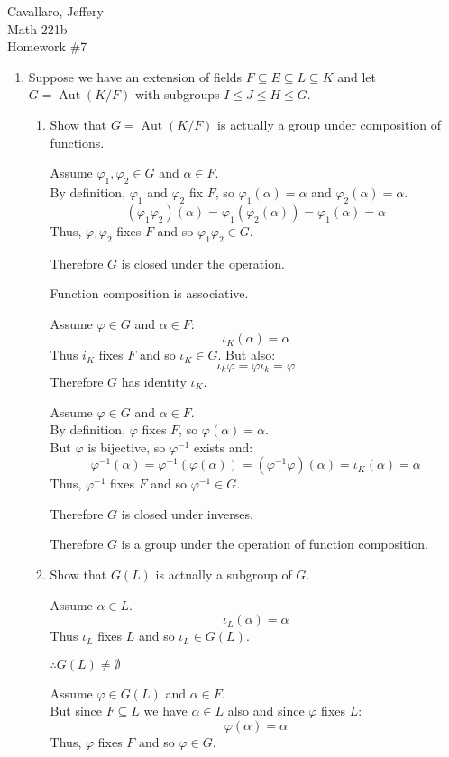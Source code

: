\documentclass[letterpaper,12pt,fleqn]{article}
\DeclareMathOperator{\Aut}{Aut}
\newcommand{\vp}{\varphi}
\renewcommand{\a}{\alpha}
\renewcommand{\i}{\iota}
\renewcommand{\a}{\alpha}
\begin{document}
Cavallaro, Jeffery \\
Math 221b \\
Homework \#7

\bigskip

\begin{enumerate}
\item Suppose we have an extension of fields $F\subseteq E\subseteq L\subseteq K$ and
  let $G=\Aut(K/F)$ with subgroups $I\le J\le H\le G$.
  \begin{enumerate}
  \item Show that $G=\Aut(K/F)$ is actually a group under composition of functions.

    Assume $\vp_1,\vp_2\in G$ and $\a\in F$. \\
    By definition, $\vp_1$ and $\vp_2$ fix $F$, so $\vp_1(\a)=\a$ and $\vp_2(\a)=\a$.
    \[(\vp_1\vp_2)(\a)=\vp_1(\vp_2(\a))=\vp_1(\a)=\a\]
    Thus, $\vp_1\vp_2$ fixes $F$ and so $\vp_1\vp_2\in G$.

    Therefore $G$ is closed under the operation.

    Function composition is associative.

    Assume $\vp\in G$ and $\a\in F$:
    \[\i_K(\a)=\a\]
    Thus $i_K$ fixes $F$ and so $\i_K\in G$. But also:
    \[\i_k\vp=\vp\i_k=\vp\]
    Therefore $G$ has identity $\i_K$.

    Assume $\vp\in G$ and $\a\in F$. \\
    By definition, $\vp$ fixes $F$, so $\vp(\a)=\a$. \\
    But $\vp$ is bijective, so $\vp^{-1}$ exists and:
    \[\vp^{-1}(\a)=\vp^{-1}(\vp(\a))=(\vp^{-1}\vp)(\a)=\i_K(\a)=\a\]
    Thus, $\vp^{-1}$ fixes $F$ and so $\vp^{-1}\in G$.

    Therefore $G$ is closed under inverses.

    Therefore $G$ is a group under the operation of function composition.

  \item Show that $G(L)$ is actually a subgroup of $G$.

    Assume $\a\in L$.
    \[\i_L(\a)=\a\]
    Thus $\i_L$ fixes $L$ and so $\i_L\in G(L)$.

    $\therefore G(L)\ne\emptyset$

    Assume $\vp\in G(L)$ and $\a\in F$. \\
    But since $F\subseteq L$ we have $\a\in L$ also and since $\vp$ fixes $L$:
    \[\vp(\a)=\a\]
    Thus, $\vp$ fixes $F$ and so $\vp\in G$.


\end{enumerate}
\end{enumerate}
\end{document}
